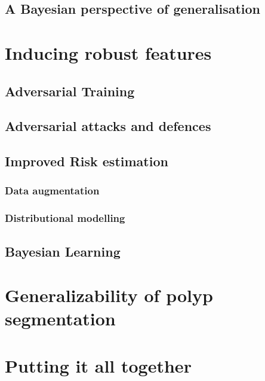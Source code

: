 		\subsection{A Bayesian perspective of generalisation}
		
\section{Inducing robust features}
	\subsection{Adversarial Training}
		\subsection{Adversarial attacks and defences}
	\subsection{Improved Risk estimation}
		\subsubsection{Data augmentation}
		\subsubsection{Distributional modelling}
	\subsection{Bayesian Learning}
	\subsection{}

\section{Generalizability of polyp segmentation}

\section{Putting it all together}